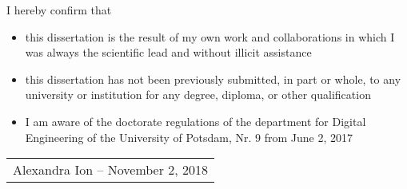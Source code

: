 

I hereby confirm that

\begin{itemize}
    \item this dissertation is the result of my own work and collaborations in which I was always the scientific lead and without illicit assistance
    \item this dissertation has not been previously submitted, in part or whole, to any university or institution for any degree, diploma, or other qualification
    \item I am aware of the doctorate regulations of the department for Digital Engineering of the University of Potsdam, Nr. 9 from June 2, 2017
\end{itemize}


\begin{tabular}{ c }
    \rule{0pt}{60pt} \\
    \hline
    \rule{0pt}{15pt} \hspace{0.5cm} Alexandra Ion -- November 2, 2018 \hspace{0.5cm} \\
\end{tabular}


